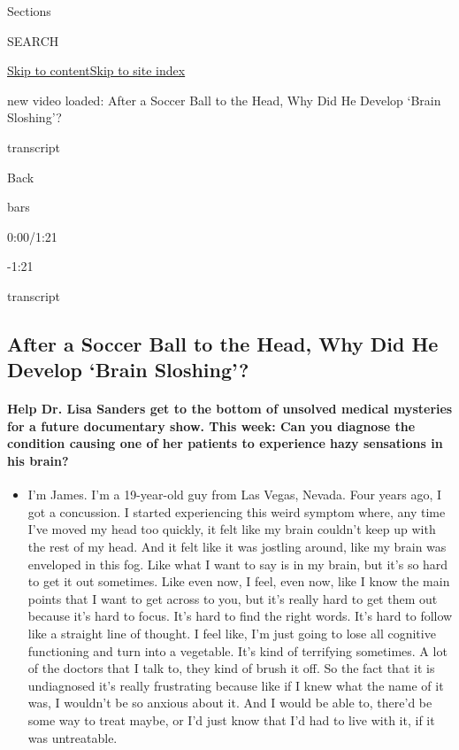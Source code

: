 Sections

SEARCH

\protect\hyperlink{site-content}{Skip to
content}\protect\hyperlink{site-index}{Skip to site index}

new video loaded: After a Soccer Ball to the Head, Why Did He Develop
`Brain Sloshing'?

transcript

Back

bars

0:00/1:21

-1:21

transcript

\hypertarget{after-a-soccer-ball-to-the-head-why-did-he-develop-brain-sloshing}{%
\subsection{After a Soccer Ball to the Head, Why Did He Develop `Brain
Sloshing'?}\label{after-a-soccer-ball-to-the-head-why-did-he-develop-brain-sloshing}}

\hypertarget{help-dr-lisa-sanders-get-to-the-bottom-of-unsolved-medical-mysteries-for-a-future-documentary-show-this-week-can-you-diagnose-the-condition-causing-one-of-her-patients-to-experience-hazy-sensations-in-his-brain}{%
\paragraph{Help Dr. Lisa Sanders get to the bottom of unsolved medical
mysteries for a future documentary show. This week: Can you diagnose the
condition causing one of her patients to experience hazy sensations in
his
brain?}\label{help-dr-lisa-sanders-get-to-the-bottom-of-unsolved-medical-mysteries-for-a-future-documentary-show-this-week-can-you-diagnose-the-condition-causing-one-of-her-patients-to-experience-hazy-sensations-in-his-brain}}

\begin{itemize}
\tightlist
\item
  I'm James. I'm a 19-year-old guy from Las Vegas, Nevada. Four years
  ago, I got a concussion. I started experiencing this weird symptom
  where, any time I've moved my head too quickly, it felt like my brain
  couldn't keep up with the rest of my head. And it felt like it was
  jostling around, like my brain was enveloped in this fog. Like what I
  want to say is in my brain, but it's so hard to get it out sometimes.
  Like even now, I feel, even now, like I know the main points that I
  want to get across to you, but it's really hard to get them out
  because it's hard to focus. It's hard to find the right words. It's
  hard to follow like a straight line of thought. I feel like, I'm just
  going to lose all cognitive functioning and turn into a vegetable.
  It's kind of terrifying sometimes. A lot of the doctors that I talk
  to, they kind of brush it off. So the fact that it is undiagnosed it's
  really frustrating because like if I knew what the name of it was, I
  wouldn't be so anxious about it. And I would be able to, there'd be
  some way to treat maybe, or I'd just know that I'd had to live with
  it, if it was untreatable.
\end{itemize}

